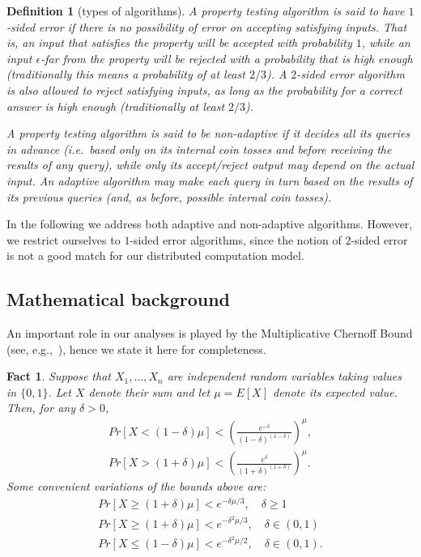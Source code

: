 \documentclass[11pt]{article}
\newtheorem{definition}[theorem]{Definition}
\newtheorem{fact}[theorem]{Fact}
\begin{document}
\begin{definition}[types of algorithms]
	A property testing algorithm is said to have {\em $1$-sided error} if there is no
	possibility of error on accepting satisfying inputs. That is, an input that satisfies the
	property will be accepted with probability $1$, while an input $\epsilon$-far from the
	property will be rejected with a probability that is high enough (traditionally this means a
	probability of at least $2/3$). A {\em $2$-sided  error} algorithm is also allowed to reject
	satisfying inputs, as long as the probability for a correct answer is high enough
	(traditionally at least $2/3$).
	
	A property testing algorithm is said to be {\em non-adaptive} if it decides all its queries in advance (i.e.\ based only on its internal coin tosses and before receiving the results of any query), while only its accept/reject output may depend on the actual input. An {\em adaptive} algorithm may make each query in turn based on the results of its previous queries (and, as before, possible internal coin tosses).
\end{definition}

In the following we address both adaptive and non-adaptive algorithms. However, we restrict ourselves to $1$-sided error algorithms, since the notion of $2$-sided error is not a good match for our distributed computation model.

\subsection{Mathematical background}

An important role in our analyses is played by the Multiplicative Chernoff Bound (see, e.g.,~\cite{Mitzenmacher}), hence we state it here for completeness.
\begin{fact}
\label{fact:chernoff}
Suppose that $X_1, ..., X_n$ are independent random variables taking values in $\{0, 1\}$. Let $X$ denote their sum and let $\mu = E[X]$ denote its expected value. Then, for any $\delta > 0$,
\begin{align*}
Pr[X < (1-\delta)\mu] < (\frac{e^{-\delta}}{(1-\delta)^{(1-\delta)}})^{\mu},\\
Pr[X > (1+\delta)\mu] < (\frac{e^{\delta}}{(1+\delta)^{(1+\delta)}})^{\mu}.
\end{align*}
Some convenient variations of the bounds above are:
\begin{align*}
Pr[X \geq (1+\delta)\mu] < e^{-\delta \mu / 3}, \quad \delta \geq 1\\
Pr[X \geq (1+\delta)\mu] < e^{-\delta^2 \mu / 3}, \quad \delta \in (0,1)\\
Pr[X \leq (1-\delta)\mu] < e^{-\delta^2 \mu / 2}, \quad \delta \in (0,1).
\end{align*}
\end{fact}
\end{document}
